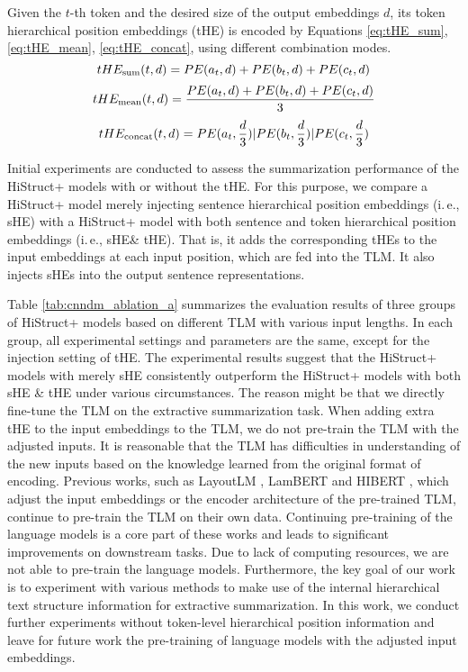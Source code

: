 \documentclass[11pt]{article}
\begin{document}
Given the $t$-th token and the desired size of the output embeddings $d$, its token hierarchical position embeddings (tHE) is encoded by Equations \ref{eq:tHE_sum}, \ref{eq:tHE_mean}, \ref{eq:tHE_concat}, using different combination modes.
\begin{equation} \label{eq:tHE_sum}
\footnotesize
tHE_{\text{sum}} (t, d) =PE(a_t,d)+PE(b_t,d)+PE(c_t,d)
\end{equation}
\begin{equation}\label{eq:tHE_mean}
\footnotesize
tHE_{\text{mean}} (t, d) =\frac{PE(a_t,d)+PE(b_t,d)+PE(c_t,d)}{3}
\end{equation}
\begin{equation}\label{eq:tHE_concat}
\footnotesize
tHE_{\text{concat}} (t, d) =PE(a_t,\frac{d}{3}) | PE(b_t,\frac{d}{3}) | PE(c_t,\frac{d}{3})
\end{equation}

Initial experiments are conducted to assess the summarization performance of the HiStruct+ models with or without the tHE. For this purpose, we compare a HiStruct+ model merely injecting sentence hierarchical position embeddings (i.\,e., sHE) with a HiStruct+ model with both sentence and token hierarchical position embeddings (i.\,e., sHE\& tHE). That is, it adds the corresponding tHEs to the input embeddings at each input position, which are fed into the TLM. It also injects sHEs into the output sentence representations.
 

Table \ref{tab:cnndm_ablation_a} summarizes the evaluation results of three groups of HiStruct+ models based on different TLM with various input lengths. In each group, all experimental settings and parameters are the same, except for the injection setting of tHE.
The experimental results suggest that the HiStruct+ models with merely sHE consistently outperform the HiStruct+ models with both sHE \& tHE under various circumstances. The reason might be that we directly fine-tune the TLM on the extractive summarization task. When adding extra tHE to the input embeddings to the TLM, we do not pre-train the TLM with the adjusted inputs. It is reasonable that the TLM has difficulties in understanding of the new inputs based on the knowledge learned from the original format of encoding. Previous works, such as LayoutLM \cite{layoutlm}, LamBERT \cite{lambert} and HIBERT \cite{zhang-etal-2019-hibert},  which adjust the input embeddings or the encoder architecture of the pre-trained TLM, continue to pre-train the TLM on their own data. Continuing pre-training of the language models is a core part of these works and leads to significant improvements on downstream tasks. Due to lack of computing resources, we are not able to pre-train the language models. Furthermore, the key goal of our work is to experiment with various methods to make use of the internal hierarchical text structure information for extractive summarization. In this work, we conduct further experiments without token-level hierarchical position information and leave for future work the pre-training of language models with the adjusted input embeddings.
\end{document}
